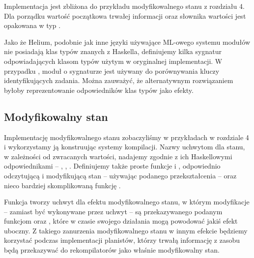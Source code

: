 

Implementacja jest zbliżona do przykładu modyfikowalnego stanu z rozdziału 4. Dla porządku wartość początkowa trwałej informacji oraz słownika wartości jest opakowana w typ .

Jako że Helium, podobnie jak inne języki używające ML-owego systemu modułów nie posiadają klas typów znanych z Haskella, definiujemy kilka sygnatur odpowiadających klasom typów użytym w oryginalnej implementacji. W przypadku , moduł o sygnaturze  jest używany do porównywania kluczy identyfikujących zadania. Można zauważyć, że alternatywnym rozwiązaniem byłoby reprezentowanie odpowiedników klas typów jako efekty.

\begin{minipage}[t]{.45\textwidth}

  

\end{minipage}\hfill
\begin{minipage}[t]{.45\textwidth}

  

\end{minipage}

\subsection{Modyfikowalny stan}

Implementację modyfikowalnego stanu zobaczyliśmy w przykładach w rozdziale 4 i wykorzystamy ją konstruując systemy kompilacji. Nazwy uchwytom dla stanu, w zależności od zwracanych wartości, nadajemy zgodnie z ich Haskellowymi odpowiednikami -- , , . Definiujemy także proste funkcje  i , odpowiednio odczytującą i modyfikującą stan -- używając podanego przekształcenia -- oraz nieco bardziej skomplikowaną funkcję .



Funkcja  tworzy uchwyt dla efektu modyfikowalnego stanu, w którym modyfikacje -- zamiast być wykonywane przez uchwyt -- są przekazywanego podanym funkcjom  oraz , które w czasie swojego działania mogą powodować jakiś efekt uboczny. Z takiego zanurzenia modyfikowalnego stanu w innym efekcie będziemy korzystać podczas implementacji planistów, którzy trwałą informację z zasobu będą przekazywać do rekompilatorów jako właśnie modyfikowalny stan.

